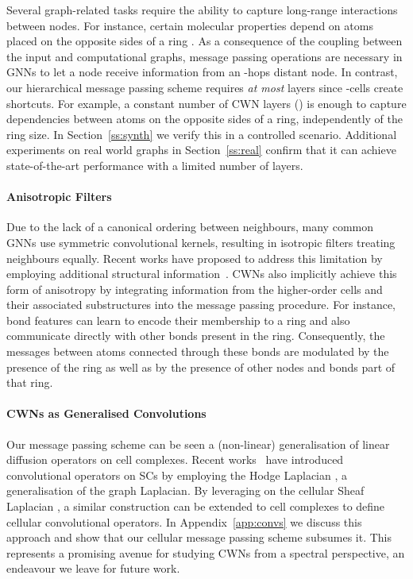 \documentclass{article}
\begin{document}
Several graph-related tasks require the ability to capture long-range interactions between nodes. For instance, certain molecular properties depend on atoms placed on the opposite sides of a ring \citep{gilmer2017neural, ramakrishnan2014quantum}. 
As a consequence of the coupling between the input and computational graphs,  message passing operations are necessary in GNNs to let a node receive information from an -hops distant node. 
In contrast, our hierarchical message passing scheme requires \emph{at most}  layers since -cells create shortcuts. 
For example, a constant number of CWN layers () is enough to capture dependencies between atoms on the opposite sides of a ring, independently of the ring size. In Section~\ref{ss:synth} we verify this in a controlled scenario. Additional experiments on real world graphs in Section~\ref{ss:real} confirm that it can achieve state-of-the-art performance with a limited number of layers.

\paragraph{Anisotropic Filters} 
Due to the lack of a canonical ordering between neighbours, many common GNNs use symmetric convolutional kernels, resulting in isotropic filters treating neighbours equally. Recent works have proposed to address this limitation by employing additional structural information~\citep{beaini2020directional, bouritsas2020improving}. CWNs also implicitly achieve this form of anisotropy by integrating information from the higher-order cells and their associated substructures into the message passing procedure. For instance, bond features can learn to encode their membership to a ring and also communicate directly with other bonds present in the ring. Consequently, the messages between atoms connected through these bonds are modulated by the presence of the ring as well as by the presence of other nodes and bonds part of that ring.

\paragraph{CWNs as Generalised Convolutions}
Our message passing scheme can be seen a (non-linear) generalisation of linear diffusion operators on cell complexes.
Recent works~\citep{ebli2020simplicial, bunch2020simplicial} have introduced convolutional operators on SCs by employing the Hodge Laplacian \citep{schaub2020random},
a generalisation of the graph Laplacian. 
By leveraging on the cellular Sheaf Laplacian \citep{HGh19}, a similar construction can be extended to cell complexes to define cellular convolutional operators. In Appendix~\ref{app:convs} we discuss this approach and show that our cellular message passing scheme subsumes it. This represents a promising avenue for studying CWNs from a spectral perspective, an endeavour we leave for future work. 
\end{document}
